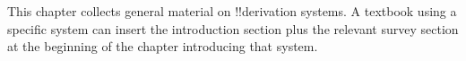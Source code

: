 \documentclass[../../../include/open-logic-chapter]{subfiles}
\begin{document}
      {}
      {}

\begin{editorial}
This chapter collects general material on !!{derivation} systems. A
textbook using a specific system can insert the introduction section
plus the relevant survey section at the beginning of the chapter
introducing that system.
\end{editorial}






\OLEndChapterHook
\end{document}
